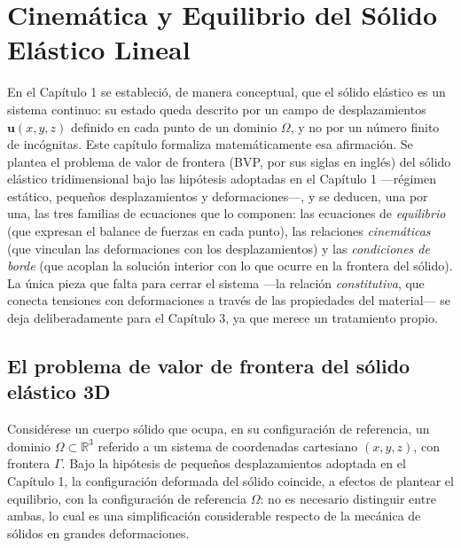 \chapter{Cinemática y Equilibrio del Sólido Elástico Lineal}
\label{sec:cap02-cinematica-equilibrio}

En el Capítulo 1 se estableció, de manera conceptual, que el sólido elástico es un sistema continuo: su estado queda descrito por un campo de desplazamientos $\bm{u}(x,y,z)$ definido en cada punto de un dominio $\Omega$, y no por un número finito de incógnitas. Este capítulo formaliza matemáticamente esa afirmación. Se plantea el problema de valor de frontera (BVP, por sus siglas en inglés) del sólido elástico tridimensional bajo las hipótesis adoptadas en el Capítulo 1 —régimen estático, pequeños desplazamientos y deformaciones—, y se deducen, una por una, las tres familias de ecuaciones que lo componen: las ecuaciones de \emph{equilibrio} (que expresan el balance de fuerzas en cada punto), las relaciones \emph{cinemáticas} (que vinculan las deformaciones con los desplazamientos) y las \emph{condiciones de borde} (que acoplan la solución interior con lo que ocurre en la frontera del sólido). La única pieza que falta para cerrar el sistema —la relación \emph{constitutiva}, que conecta tensiones con deformaciones a través de las propiedades del material— se deja deliberadamente para el Capítulo 3, ya que merece un tratamiento propio.

\section{El problema de valor de frontera del sólido elástico 3D}
\label{sec:cap02-bvp}

Considérese un cuerpo sólido que ocupa, en su configuración de referencia, un dominio $\Omega \subset \mathbb{R}^3$ referido a un sistema de coordenadas cartesiano $(x,y,z)$, con frontera $\Gamma$. Bajo la hipótesis de pequeños desplazamientos adoptada en el Capítulo 1, la configuración deformada del sólido coincide, a efectos de plantear el equilibrio, con la configuración de referencia $\Omega$: no es necesario distinguir entre ambas, lo cual es una simplificación considerable respecto de la mecánica de sólidos en grandes deformaciones.

